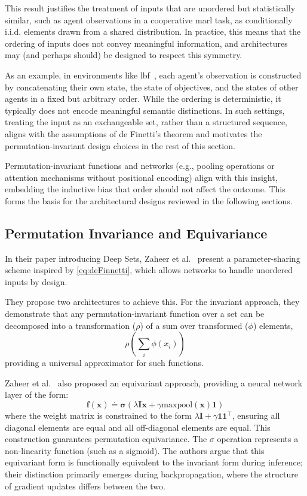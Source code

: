\documentclass{article}
\begin{document}
This result justifies the treatment of inputs that are unordered but statistically similar,
such as agent observations in a cooperative \gls{marl} task, 
as conditionally i.i.d. elements drawn from a shared distribution. 
In practice, this means that the ordering of inputs does not convey meaningful information, 
and architectures may (and perhaps should) be designed to respect this symmetry.

As an example, in environments like \gls{lbf}~\cite{papoudakis2021}, 
each agent's observation is constructed by concatenating their own state, 
the state of objectives, and the states of other agents in a fixed but arbitrary order. 
While the ordering is deterministic, it typically does not encode meaningful 
semantic distinctions. In such settings, treating the input as an exchangeable set,
rather than a structured sequence, aligns with the assumptions of de Finetti's theorem 
and motivates the permutation-invariant design choices in the rest of this section.

Permutation-invariant functions and networks (e.g., pooling operations or 
attention mechanisms without positional encoding) align with this insight, %
embedding the inductive bias that order should not affect the outcome. 
This forms the basis for the architectural designs reviewed in the following sections.


\subsection{Permutation Invariance and Equivariance}

In their paper introducing Deep Sets, Zaheer et al.~\cite{zaheer2017} 
present a parameter-sharing scheme inspired by \cref{eq:deFinnetti}, 
which allows networks to handle unordered inputs by design.

They propose two architectures to achieve this.
For the invariant approach, they demonstrate that any 
permutation-invariant function over a set can 
be decomposed into a transformation (\(\rho\)) of a sum over 
transformed (\(\phi\)) elements,
\begin{equation*}
    \rho\left(\sum_i \phi(x_i)\right)
\end{equation*}
providing a universal approximator for such functions. 

Zaheer et al.~\cite{zaheer2017} also proposed an equivariant approach,
providing a neural network layer of the form:
\begin{equation*}
    \mathbf{f}(\mathbf{x}) \doteq \mathbf\sigma (\lambda\mathbf{Ix} 
    + \gamma \text{maxpool}(\mathbf{x})\mathbf{1}) 
\end{equation*}
where the weight matrix is constrained to the form 
\(\lambda\mathbf{I} + \gamma\mathbf{11}^\top\), ensuring all 
diagonal elements are equal and all off-diagonal elements are equal. 
This construction guarantees permutation equivariance.
The \(\sigma\) operation represents a non-linearity function (such as a sigmoid).
The authors argue that this equivariant form is functionally equivalent to the 
invariant form during inference; their distinction primarily emerges during backpropagation, 
where the structure of gradient updates differs between the two.
\end{document}
